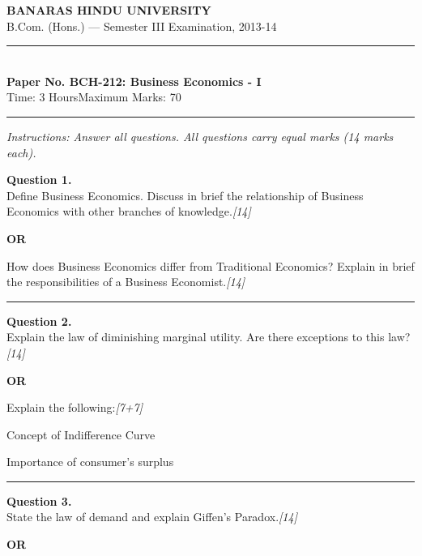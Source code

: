 \documentclass[11pt,a4paper]{article}
\newcommand{\pts}[1]{\hfill   \textit{[#1]}}
\begin{document}
\begin{center}
  {\large\bfseries BANARAS HINDU UNIVERSITY}\\[2pt]
  {\normalsize B.Com. (Hons.) --- Semester III Examination, 2013-14}\\[6pt]
  \rule{0.8\linewidth}{0.5pt}\\[6pt]
  {\large\bfseries Paper No. BCH-212: Business Economics - I}\\[4pt]
  {\normalsize Time: 3 Hours\hfill Maximum Marks: 70}
\end{center}

\rule{\linewidth}{0.4pt}

\smallskip



\noindent   \textit{Instructions: Answer all questions. All questions carry equal marks (14 marks each).}

\bigskip




\noindent   \textbf{Question 1.} \\
Define Business Economics. Discuss in brief the relationship of Business Economics with other branches of knowledge.\pts{14}

\centerline{   \textbf{OR}}

How does Business Economics differ from Traditional Economics? Explain in brief the responsibilities of a Business Economist.\pts{14}

\medskip\rule{\linewidth}{0.2pt}




\noindent   \textbf{Question 2.} \\
Explain the law of diminishing marginal utility. Are there exceptions to this law?\pts{14}

\centerline{   \textbf{OR}}

Explain the following:\pts{7+7}

\begin{parts}
  \item Concept of Indifference Curve
  \item Importance of consumer's surplus
\end{parts}

\medskip\rule{\linewidth}{0.2pt}




\noindent   \textbf{Question 3.} \\
State the law of demand and explain Giffen's Paradox.\pts{14}

\centerline{   \textbf{OR}}
\end{document}
